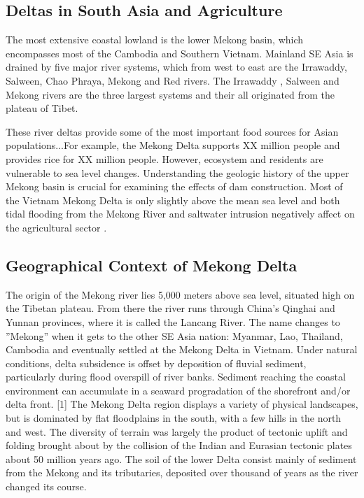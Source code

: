 \subsection{Deltas in South Asia and Agriculture}

The most extensive coastal lowland is the lower Mekong basin, which encompasses most of the Cambodia and Southern Vietnam. Mainland SE Asia is drained by five major river systems, which from west to east are the Irrawaddy, Salween, Chao Phraya, Mekong and Red rivers. The Irrawaddy , Salween and Mekong rivers are the three largest systems and their all originated from the plateau of Tibet. 

These river deltas provide some of the most important food sources for Asian populations...For example, the Mekong Delta supports XX million people and provides rice for XX million people. However, ecosystem and residents are vulnerable to sea level changes. Understanding the geologic history of the upper Mekong basin is crucial for examining the effects of dam construction. Most of the Vietnam Mekong Delta is only slightly above the mean sea level and both tidal flooding from the Mekong River and saltwater intrusion negatively affect on the agricultural sector \citep{wassmann2004sea}.

\subsection{Geographical Context of Mekong Delta}

  The origin of the Mekong river lies 5,000 meters above sea level, situated high on the Tibetan plateau. From there the river runs through China's Qinghai and Yunnan provinces, where it is called the Lancang River. The name changes to ''Mekong'' when it gets to the other SE Asia nation: Myanmar, Lao, Thailand, Cambodia and eventually settled at the Mekong Delta in Vietnam. Under natural conditions, delta subsidence is offset by deposition of fluvial sediment, particularly during flood overspill of river banks. Sediment reaching the coastal environment can accumulate in a seaward progradation of the shorefront and/or delta front. [1] The Mekong Delta region displays a variety of physical landscapes, but is dominated by flat floodplains in the south, with a few hills in the north and west. The diversity of terrain was largely the product of tectonic uplift and folding brought about by the collision of the Indian and Eurasian tectonic plates about 50 million years ago. The soil of the lower Delta consist mainly of sediment from the Mekong and its tributaries, deposited over thousand of years as the river changed its course.
	
